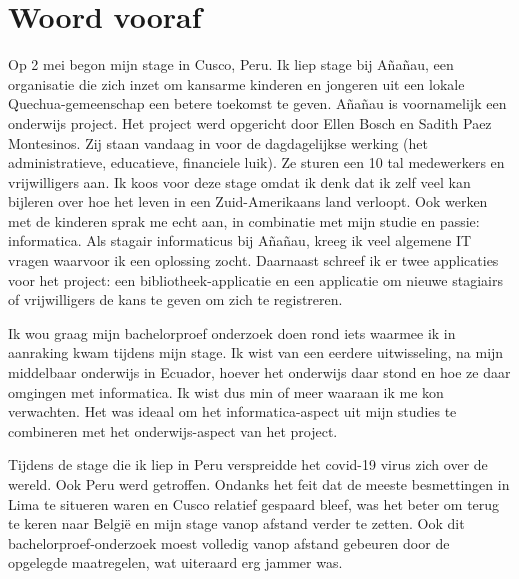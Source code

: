 
\chapter*{Woord vooraf}
\label{ch:voorwoord}


Op 2 mei begon mijn stage in Cusco, Peru. Ik liep stage bij Añañau, een organisatie die zich inzet om kansarme kinderen en jongeren uit een lokale Quechua-gemeenschap een betere toekomst te geven. Añañau is voornamelijk een onderwijs project. Het project werd opgericht door Ellen Bosch en Sadith Paez Montesinos. Zij staan vandaag in voor de dagdagelijkse werking (het administratieve, educatieve, financiele luik). Ze sturen een 10 tal medewerkers en vrijwilligers aan. Ik koos voor deze stage omdat ik denk dat ik zelf veel kan bijleren over hoe het leven in een Zuid-Amerikaans land verloopt. Ook werken met de kinderen sprak me echt aan, in combinatie met mijn studie en passie: informatica. Als stagair informaticus bij Añañau, kreeg ik veel algemene IT vragen waarvoor ik een oplossing zocht. Daarnaast schreef ik er twee applicaties voor het project: een bibliotheek-applicatie en een applicatie om nieuwe stagiairs of vrijwilligers de kans te geven om zich te registreren. 

Ik wou graag mijn bachelorproef onderzoek doen rond iets waarmee ik in aanraking kwam tijdens mijn stage. Ik wist van een eerdere uitwisseling, na mijn middelbaar onderwijs in Ecuador, hoever het onderwijs daar stond en hoe ze daar omgingen met informatica. Ik wist dus min of meer waaraan ik me kon verwachten. Het was ideaal om het informatica-aspect uit mijn studies te combineren met het onderwijs-aspect van het project. 

Tijdens de stage die ik liep in Peru verspreidde het covid-19 virus zich over de wereld. Ook Peru werd getroffen. Ondanks het feit dat de meeste besmettingen in Lima te situeren waren en Cusco relatief gespaard bleef, was het beter om terug te keren naar België en mijn stage vanop afstand verder te zetten. Ook dit bachelorproef-onderzoek moest volledig vanop afstand gebeuren door de opgelegde maatregelen, wat uiteraard erg jammer was.

